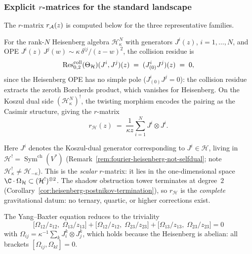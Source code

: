 \subsubsection{Explicit $r$-matrices for the standard landscape}

The $r$-matrix $r_{\mathcal{A}}(z)$ is computed below for the three
representative families.

\begin{computation}
\label{comp:thqg-V-heisenberg-r}
For the rank-$N$ Heisenberg algebra
$\mathcal{H}^N_\kappa$ with generators $J^i(z)$,
$i = 1,\dotsc,N$, and OPE
$J^i(z)\,J^j(w) \sim \kappa\,\delta^{ij}/(z-w)^2$, the collision
residue is
\begin{equation}\label{eq:thqg-V-heis-collision}
\operatorname{Res}^{\mathrm{coll}}_{0,2}(\Theta_{\mathcal{H}})
 (J^i, J^j)(z)
\;=\;
(J^i_{(0)}J^j)(z)
\;=\;
0,
\end{equation}
since the Heisenberg OPE has no simple pole
($J^i_{(0)}J^j = 0$): the collision residue extracts the
zeroth Borcherds product, which vanishes for Heisenberg.
On the Koszul dual side $(\mathcal{H}^N_\kappa)^!$,
the twisting morphism encodes the pairing as the Casimir structure,
giving the $r$-matrix
\begin{equation}\label{eq:thqg-V-heis-r}
r_{\mathcal{H}}(z)
\;=\;
\frac{1}{\kappa z}
\sum_{i=1}^N
J^i \otimes J^i.
\end{equation}

Here $J^i$ denotes the Koszul-dual generator corresponding to
$J^i \in \mathcal{H}$, living in
$\mathcal{H}^! = \operatorname{Sym}^{\mathrm{ch}}(V^*)$
(Remark~\ref{rem:fourier-heisenberg-not-selfdual};
note $\mathcal{H}_\kappa^! \neq \mathcal{H}_{-\kappa}$).
This is the \emph{scalar} $r$-matrix: it lies in the one-dimensional
space $\C \cdot \Omega_{\mathcal{H}} \subset
(\mathcal{H}^!)^{\otimes 2}$. The shadow obstruction tower terminates at
degree~$2$ (Corollary~\ref{cor:heisenberg-postnikov-termination}),
so $r_{\mathcal{H}}$ is the \emph{complete} gravitational datum:
no ternary, quartic, or higher corrections exist.

The Yang--Baxter equation reduces to the triviality
\begin{equation}\label{eq:thqg-V-heis-ybe}
\bigl[\Omega_{12}/z_{12},\;\Omega_{13}/z_{13}\bigr]
+
\bigl[\Omega_{12}/z_{12},\;\Omega_{23}/z_{23}\bigr]
+
\bigl[\Omega_{13}/z_{13},\;\Omega_{23}/z_{23}\bigr]
= 0
\end{equation}
with $\Omega_{ij} = \kappa^{-1}\sum_k J^k_i \otimes J^k_j$, which
holds because the Heisenberg is abelian: all brackets
$[\Omega_{ij}, \Omega_{kl}] = 0$.
\end{computation}

